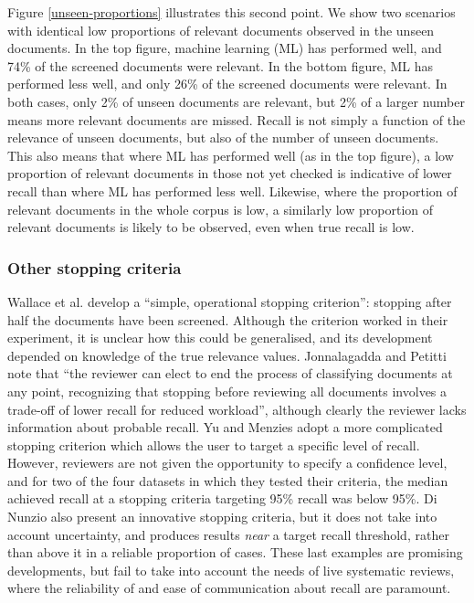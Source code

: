 \documentclass{bmcart}
\begin{document}
Figure \ref{unseen-proportions} illustrates this second point. 
We show two scenarios with identical low proportions of relevant documents observed in the unseen documents.
In the top figure, machine learning (ML) has performed well, and 74\% of the screened documents were relevant. 
In the bottom figure,  ML has performed less well, and only 26\% of the screened documents were relevant.
In both cases, only 2\% of unseen documents are relevant, but 2\% of a larger number means more relevant documents are missed.
Recall is not simply a function of the relevance of unseen documents, but also of the number of unseen documents. 
This also means that where ML has performed well (as in the top figure), a low proportion of relevant documents in those not yet checked is indicative of lower recall than where ML has performed less well.
Likewise, where the proportion of relevant documents in the whole corpus is low, a similarly low proportion of relevant documents is likely to be observed, even when true recall is low.



\subsubsection*{Other stopping criteria}

Wallace et al. \cite{Wallace2010a} develop a ``simple, operational stopping criterion'': stopping after half the documents have been screened. Although the criterion worked in their experiment, it is unclear how this could be generalised, and its development depended on knowledge of the true relevance values. 
Jonnalagadda and Petitti \cite{Jonnalagadda2013} note that ``the reviewer can elect to end the process of classifying documents at any point, recognizing that stopping before reviewing all documents involves a trade-off of lower recall for reduced workload'', although clearly the reviewer lacks information about probable recall.
Yu and Menzies \cite{Yu2019} adopt a more complicated stopping criterion which allows the user to target a specific level of recall. However, reviewers are not given the opportunity to specify a confidence level, and for two of the four datasets in which they tested their criteria, the median achieved recall at a stopping criteria targeting 95\% recall was below 95\%. Di Nunzio \cite{DiNunzio2018} also present an innovative stopping criteria, but it does not take into account uncertainty, and produces results \textit{near} a target recall threshold, rather than above it in a reliable proportion of cases. 
These last examples are promising developments, but fail to take into account the needs of live systematic reviews, where the reliability of and ease of communication about recall are paramount.
\end{document}
